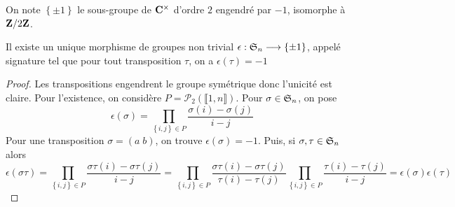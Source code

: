 On note $\left\{ \pm1 \right\} $ le sous-groupe de $\mathbf C^\times$ d'ordre $2$ engendré par  $-1$, isomorphe à  $\mathbf Z / 2\mathbf Z$.

\begin{thmdef}
    Il existe un unique morphisme de groupes non trivial $\epsilon:\mathfrak S_n \longrightarrow \left\{ \pm1 \right\} $, appelé signature tel que pour tout transposition $\tau$, on a  $\epsilon(\tau)=-1$
\end{thmdef}

\begin{proof}
    Les transpositions engendrent le groupe symétrique donc l'unicité est claire. Pour l'existence, on considère $P = \mathcal  P_2(\llbracket 1, n \rrbracket )$. Pour $\sigma \in  \mathfrak S_n$, on pose \[
        \epsilon(\sigma)=\prod_{\left\{ i, j \right\}\in P } \frac{\sigma(i)-\sigma(j)}{i-j}
    \] 
    Pour une transposition $\sigma = (a\;b)$, on trouve  $\epsilon(\sigma)=-1$. Puis, si  $\sigma, \tau \in  \mathfrak S_n$ alors \[
        \epsilon(\sigma\tau)=\prod_{\left\{ i, j \right\} \in  P } \frac{\sigma\tau(i)-\sigma\tau(j)}{i-j}=\prod_{\left\{ i, j \right\} \in  P } \frac{\sigma\tau(i)-\sigma\tau(j)}{\tau(i)-\tau(j)}\prod_{\left\{ i, j \right\}  \in P}\frac{\tau(i)-\tau(j)}{i-j} = \epsilon(\sigma)\epsilon(\tau)
    \] 
\end{proof}
